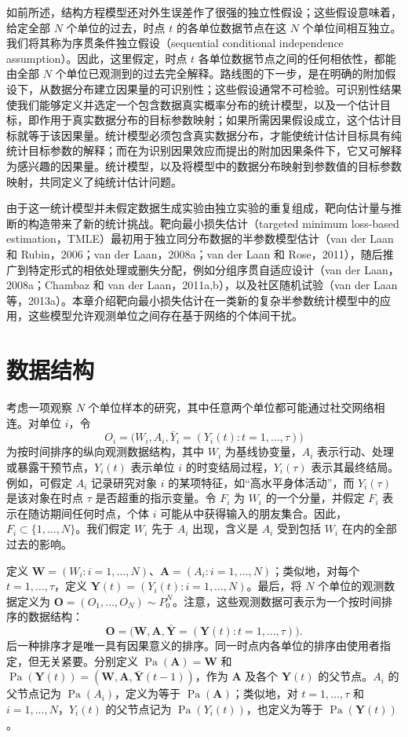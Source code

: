 如前所述，结构方程模型还对外生误差作了很强的独立性假设；这些假设意味着，给定全部 $N$ 个单位的过去，时点 $t$ 的各单位数据节点在这 $N$ 个单位间相互独立。我们将其称为序贯条件独立假设（sequential conditional independence assumption）。因此，这里假定，时点 $t$ 各单位数据节点之间的任何相依性，都能由全部 $N$ 个单位已观测到的过去完全解释。路线图的下一步，是在明确的附加假设下，从数据分布建立因果量的可识别性；这些假设通常不可检验。可识别性结果使我们能够定义并选定一个包含数据真实概率分布的统计模型，以及一个估计目标，即作用于真实数据分布的目标参数映射；如果所需因果假设成立，这个估计目标就等于该因果量。统计模型必须包含真实数据分布，才能使统计估计目标具有纯统计目标参数的解释；而在为识别因果效应而提出的附加因果条件下，它又可解释为感兴趣的因果量。统计模型，以及将模型中的数据分布映射到参数值的目标参数映射，共同定义了纯统计估计问题。

由于这一统计模型并未假定数据生成实验由独立实验的重复组成，靶向估计量与推断的构造带来了新的统计挑战。靶向最小损失估计（targeted minimum loss-based estimation，TMLE）最初用于独立同分布数据的半参数模型估计（van der Laan 和 Rubin，2006；van der Laan，2008a；van der Laan 和 Rose，2011），随后推广到特定形式的相依处理或删失分配，例如分组序贯自适应设计（van der Laan，2008a；Chambaz 和 van der Laan，2011a,b），以及社区随机试验（van der Laan 等，2013a）。本章介绍靶向最小损失估计在一类新的复杂半参数统计模型中的应用，这些模型允许观测单位之间存在基于网络的个体间干扰。

\section{数据结构}

考虑一项观察 $N$ 个单位样本的研究，其中任意两个单位都可能通过社交网络相连。对单位 $i$，令
\[
 O_i=\bigl(W_i,A_i,\bar Y_i=(Y_i(t):t=1,\ldots,\tau)\bigr)
\]
为按时间排序的纵向观测数据结构，其中 $W_i$ 为基线协变量，$A_i$ 表示行动、处理或暴露干预节点，$Y_i(t)$ 表示单位 $i$ 的时变结局过程，$Y_i(\tau)$ 表示其最终结局。例如，可假定 $A_i$ 记录研究对象 $i$ 的某项特征，如“高水平身体活动”，而 $Y_i(\tau)$ 是该对象在时点 $\tau$ 是否超重的指示变量。令 $F_i$ 为 $W_i$ 的一个分量，并假定 $F_i$ 表示在随访期间任何时点，个体 $i$ 可能从中获得输入的朋友集合。因此，$F_i\subset\{1,\ldots,N\}$。我们假定 $W_i$ 先于 $A_i$ 出现，含义是 $A_i$ 受到包括 $W_i$ 在内的全部过去的影响。

定义 $\mathbf W=(W_i:i=1,\ldots,N)$、$\mathbf A=(A_i:i=1,\ldots,N)$；类似地，对每个 $t=1,\ldots,\tau$，定义 $\mathbf Y(t)=(Y_i(t):i=1,\ldots,N)$。最后，将 $N$ 个单位的观测数据定义为 $\mathbf O=(O_1,\ldots,O_N)\sim P_0^N$。注意，这些观测数据可表示为一个按时间排序的数据结构：
\[
 \mathbf O=\bigl(\mathbf W,\mathbf A,\bar{\mathbf Y}=(\mathbf Y(t):t=1,\ldots,\tau)\bigr).
\]
后一种排序才是唯一具有因果意义的排序。同一时点内各单位的排序由使用者指定，但无关紧要。分别定义 $\operatorname{Pa}(\mathbf A)=\mathbf W$ 和 $\operatorname{Pa}(\mathbf Y(t))=(\mathbf W,\mathbf A,\bar{\mathbf Y}(t-1))$，作为 $\mathbf A$ 及各个 $\mathbf Y(t)$ 的父节点。$A_i$ 的父节点记为 $\operatorname{Pa}(A_i)$，定义为等于 $\operatorname{Pa}(\mathbf A)$；类似地，对 $t=1,\ldots,\tau$ 和 $i=1,\ldots,N$，$Y_i(t)$ 的父节点记为 $\operatorname{Pa}(Y_i(t))$，也定义为等于 $\operatorname{Pa}(\mathbf Y(t))$。

